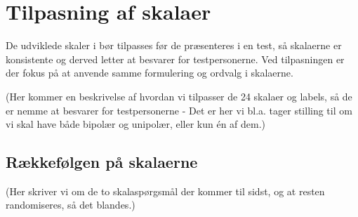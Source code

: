 \chapter{Tilpasning af skalaer}
\label{TestAfSkalaTilpasningAfSkalaer}
%
De udviklede skaler i  bør tilpasses før de præsenteres i en test, så skalaerne er konsistente og derved letter at besvarer for testpersonerne. \blankline
%
Ved tilpasningen er der fokus på at anvende samme formulering og ordvalg i skalaerne.

(Her kommer en beskrivelse af hvordan vi tilpasser de 24 skalaer og labels, så de er nemme at besvarer for testpersonerne - Det er her vi bl.a. tager stilling til om vi skal have både bipolær og unipolær, eller kun én af dem.) 

\section{Rækkefølgen på skalaerne}
(Her skriver vi om de to skalaspørgsmål der kommer til sidst, og at resten randomiseres, så det blandes.)